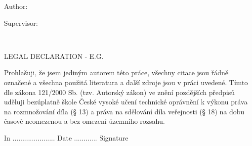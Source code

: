 
\pagestyle{empty}
\hypersetup{pageanchor=false}

\begin{center}

{\LARGE\bfseries\InstitutionName}

\vspace{-18mm}
\vfill

{\LARGE\FacultyName}

\vfill

\centerline{\mbox{\def\svgwidth{\columnwidth}\scalebox{0.25}{}}}

\vspace{-8mm}
\vfill

{\bf\Large \ThesisType}

\vfill


\vspace{15mm}

{\LARGE\bfseries\ThesisName}


\vfill


Author: \hfill \AuthorName

Supervisor: \hfill \SupervisorName

\vspace{15mm}
\SubmissionMonth \ \SubmissionYear

\end{center}



\newpage
\hypersetup{pageanchor=true}
\pagestyle{plain}


\openright


\vspace*{\fill}


\noindent


\vspace{1cm}
LEGAL DECLARATION - E.G.

Prohlašuji, že jsem jediným autorem této práce, všechny citace jsou
řádně označené a všechna použitá literatura a další zdroje jsou v práci uvedené.
Tímto dle zákona 121/2000 Sb. (tzv. Autorský zákon) ve znění pozdějších předpisů uděluji
bezúplatně škole České vysoké učení technické oprávnění k výkonu práva na rozmnožování díla
(§ 13) a práva na sdělování díla veřejnosti (§ 18) na dobu časově neomezenou a bez omezení
územního rozsahu.


\noindent
In ......................  Date ............
\hspace{4cm}
Signature


\newpage


